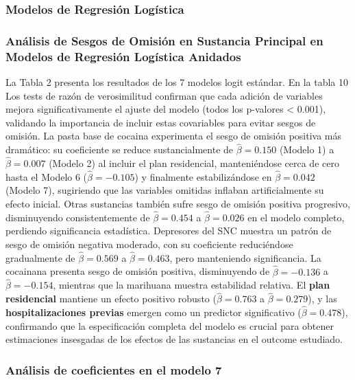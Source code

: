 \documentclass[
  spanish,
  10pt,
]{article}
\begin{document}
\subsubsection{Modelos de Regresión
Logística}\label{modelos-de-regresiuxf3n-loguxedstica}

\subsubsection{Análisis de Sesgos de Omisión en Sustancia Principal en
Modelos de Regresión Logística
Anidados}\label{anuxe1lisis-de-sesgos-de-omisiuxf3n-en-sustancia-principal-en-modelos-de-regresiuxf3n-loguxedstica-anidados}

La Tabla 2 presenta los resultados de los 7 modelos logit estándar. En
la tabla 10 Los tests de razón de verosimilitud confirman que cada
adición de variables mejora significativamente el ajuste del modelo
(todos los p-valores \textless{} 0.001), validando la importancia de
incluir estas covariables para evitar sesgos de omisión. La pasta base
de cocaina experimenta el sesgo de omisión positiva más dramático: su
coeficiente se reduce sustancialmente de \(\hat{\beta}=0.150\) (Modelo
1) a \(\hat{\beta}=0.007\) (Modelo 2) al incluir el plan residencial,
manteniéndose cerca de cero hasta el Modelo 6 (\(\hat{\beta}=-0.105\)) y
finalmente estabilizándose en \(\hat{\beta}=0.042\) (Modelo 7),
sugiriendo que las variables omitidas inflaban artificialmente su efecto
inicial. Otras sustancias también sufre sesgo de omisión positiva
progresivo, disminuyendo consistentemente de \(\hat{\beta}=0.454\) a
\(\hat{\beta}=0.026\) en el modelo completo, perdiendo significancia
estadística. Depresores del SNC muestra un patrón de sesgo de omisión
negativa moderado, con su coeficiente reduciéndose gradualmente de
\(\hat{\beta}=0.569\) a \(\hat{\beta}=0.463\), pero manteniendo
significancia. La cocainana presenta sesgo de omisión positiva,
disminuyendo de \(\hat{\beta}=-0.136\) a \(\hat{\beta}=-0.154\),
mientras que la marihuana muestra estabilidad relativa. El \textbf{plan
residencial} mantiene un efecto positivo robusto (\(\hat{\beta}=0.763\)
a \(\hat{\beta}=0.279\)), y las \textbf{hospitalizaciones previas}
emergen como un predictor significativo (\(\hat{\beta}=0.478\)),
confirmando que la especificación completa del modelo es crucial para
obtener estimaciones insesgadas de los efectos de las sustancias en el
outcome estudiado.

\subsubsection{Análisis de coeficientes en el modelo
7}\label{anuxe1lisis-de-coeficientes-en-el-modelo-7}
\end{document}
